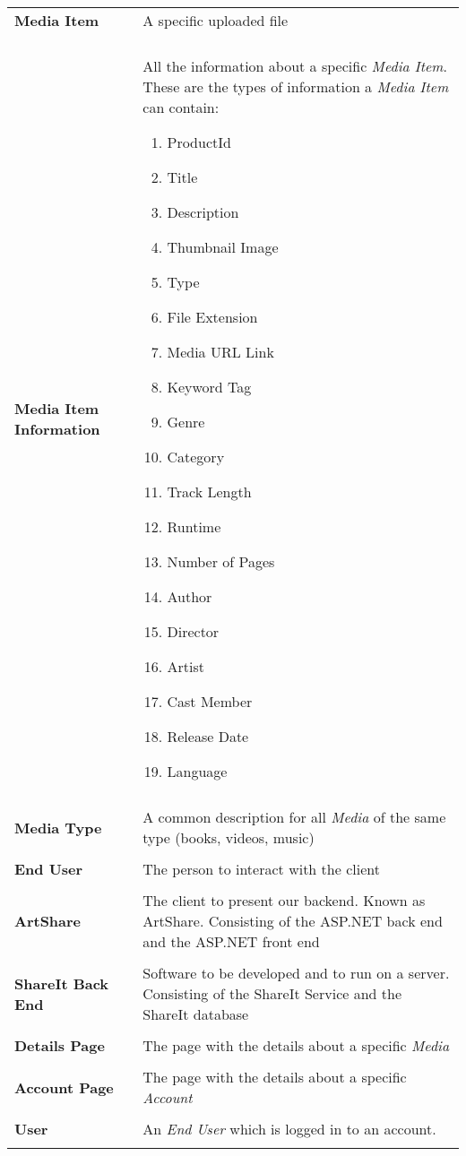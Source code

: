 \documentclass[../report.tex]{subfiles}
\begin{document}
\begin{tabular}{l p{10 cm}}
\textbf{Media Item} & A specific uploaded file \\ \\
\textbf{Media Item Information} & All the information  about a specific \textit{Media Item}. These are the types of information a \textit{Media Item} can contain:
\begin{enumerate}
\item ProductId
\item Title
\item Description
\item Thumbnail Image
\item Type
\item File Extension
\item Media URL Link
\item Keyword Tag
\item Genre
\item Category %
\item Track Length
\item Runtime
\item Number of Pages
\item Author
\item Director
\item Artist
\item Cast Member
\item Release Date
\item Language
\end{enumerate} \\ \\
\textbf{Media Type} & A common description for all \textit{Media} of the same type (books, videos, music) \\ \\
\textbf{End User} & The person to interact with the client \\ \\
\textbf{ArtShare} & The client to present our backend. Known as ArtShare. Consisting of the ASP.NET back end and the ASP.NET front end \\ \\
\textbf{ShareIt Back End} & Software to be developed and to run on a server. Consisting of the ShareIt Service and the ShareIt database \\ \\
\textbf{Details Page} & The page with the details about a specific \textit{Media} \\ \\
\textbf{Account Page} & The page with the details about a specific \textit{Account} \\ \\
\textbf{User} & An \textit{End User} which is logged in to an account.\\ \\
\end{tabular}
\end{document}
